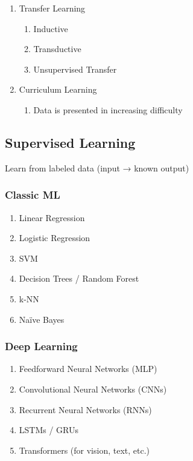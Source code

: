 \begin{multicols}{2}
\begin{enumerate}
    \item Transfer Learning
    \begin{enumerate}
      \item Inductive
      \item Transductive
      \item Unsupervised Transfer
    \end{enumerate}

    \item Curriculum Learning
    \begin{enumerate}
      \item Data is presented in increasing difficulty
    \end{enumerate}
\end{enumerate}
\end{multicols}



\clearpage


\subsection*{Supervised Learning}

Learn from labeled data (input → known output)

\begin{table}[H]
\begin{minipage}{0.45\linewidth}
\subsubsection*{Classic ML}
\begin{enumerate}
    \item Linear Regression
    \item Logistic Regression
    \item SVM
    \item Decision Trees / Random Forest
    \item k-NN
    \item Naïve Bayes
\end{enumerate}
\end{minipage}
\hfill
\begin{minipage}{0.45\linewidth}
\subsubsection*{Deep Learning}
\begin{enumerate}
    \item Feedforward Neural Networks (MLP)
    \item Convolutional Neural Networks (CNNs)
    \item Recurrent Neural Networks (RNNs)
    \item LSTMs / GRUs
    \item Transformers (for vision, text, etc.)
\end{enumerate}
\end{minipage}
\end{table}







